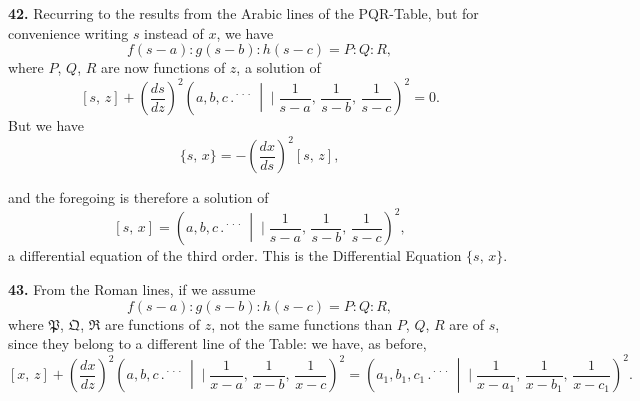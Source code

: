 \documentclass[11pt]{article}
\newcommand{\artno}[1]{\textbf{#1.}\quad}
\begin{document}
\artno{42} Recurring to the results from the Arabic lines of the PQR-Table, but for
convenience writing $s$ instead of $x$, we have
\[
   f(s-a) : g(s-b) : h(s-c) = P : Q : R,
\]
where $P$, $Q$, $R$ are now functions of $z$, a solution of
\[
   [s,\,z] + \left(\frac{ds}{dz}\right)^{\!2}\!\left(a, b, c \,.{}^{\!\cdot\!\cdot\!\cdot}\,\middle|\!\!\!\mid \frac{1}{s-a},\,\frac{1}{s-b},\,\frac{1}{s-c}\right)^{\!2} = 0.
\]
But we have
\[
   \{s,\,x\} = -\left(\frac{dx}{ds}\right)^{\!2}[s,\,z],
\]

\newpage
and the foregoing is therefore a solution of
\[
   [s,\,x] = \left(a, b, c \,.{}^{\!\cdot\!\cdot\!\cdot}\,\middle|\!\!\!\mid \frac{1}{s-a},\,\frac{1}{s-b},\,\frac{1}{s-c}\right)^{\!2},
\]
a differential equation of the third order. This is the Differential Equation $\{s,\,x\}$.

\artno{43} From the Roman lines, if we assume
\[
   f(s-a) : g(s-b) : h(s-c) = P : Q : R,
\]
where $\mathfrak{P}$, $\mathfrak{Q}$, $\mathfrak{R}$ are functions of $z$, not the same functions than $P$, $Q$, $R$ are of $s$,
since they belong to a different line of the Table: we have, as before,
\[
   [x,\,z] + \left(\frac{dx}{dz}\right)^{\!2}\!\left(a, b, c \,.{}^{\!\cdot\!\cdot\!\cdot}\,\middle|\!\!\!\mid \frac{1}{x-a},\,\frac{1}{x-b},\,\frac{1}{x-c}\right)^{\!2}
   = \left(a_{1}, b_{1}, c_{1} \,.{}^{\!\cdot\!\cdot\!\cdot}\,\middle|\!\!\!\mid \frac{1}{x-a_{1}},\,\frac{1}{x-b_{1}},\,\frac{1}{x-c_{1}}\right)^{\!2}.
\]
\end{document}
